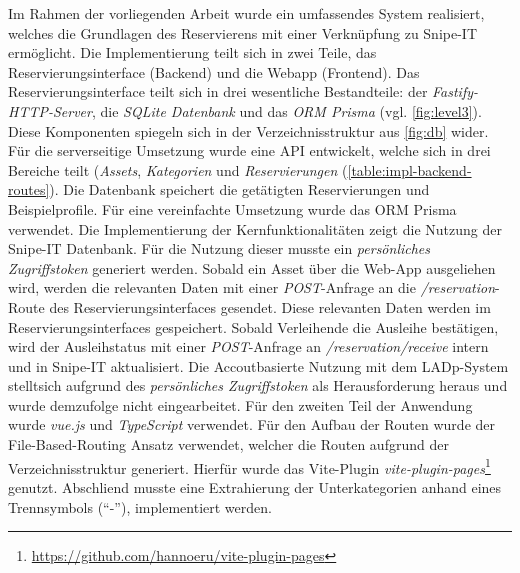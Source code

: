 Im Rahmen der vorliegenden Arbeit wurde ein umfassendes System realisiert, welches die Grundlagen
des Reservierens mit einer Verknüpfung zu Snipe-IT ermöglicht. Die Implementierung teilt sich in
zwei Teile, das Reservierungsinterface (Backend) und die Webapp (Frontend). Das
Reservierungsinterface teilt sich in drei wesentliche Bestandteile: der
\textit{Fastify-HTTP-Server}, die \textit{SQLite Datenbank} und das \textit{ORM Prisma} (vgl.
\ref{fig:level3}). Diese Komponenten spiegeln sich in der Verzeichnisstruktur aus \ref{fig:db}
wider. Für die serverseitige Umsetzung wurde eine API entwickelt, welche sich in drei Bereiche teilt
(\textit{Assets}, \textit{Kategorien} und \textit{Reservierungen} (\ref{table:impl-backend-routes}).
Die Datenbank speichert die getätigten Reservierungen und Beispielprofile. Für eine vereinfachte
Umsetzung wurde das ORM Prisma verwendet. Die Implementierung der Kernfunktionalitäten zeigt die
Nutzung der Snipe-IT Datenbank. Für die Nutzung dieser musste ein \textit{persönliches
Zugriffstoken} generiert werden. Sobald ein Asset über die Web-App ausgeliehen wird, werden die
relevanten Daten mit einer \textit{POST}-Anfrage an die \textit{/reservation}-Route des
Reservierungsinterfaces gesendet. Diese relevanten Daten werden im Reservierungsinterfaces
gespeichert. Sobald Verleihende die Ausleihe bestätigen, wird der Ausleihstatus mit einer
\textit{POST}-Anfrage an \textit{/reservation/receive} intern und in Snipe-IT aktualisiert. Die
Accoutbasierte Nutzung mit dem LADp-System stelltsich aufgrund des \textit{persönliches
Zugriffstoken} als Herausforderung heraus und wurde demzufolge nicht eingearbeitet. Für den zweiten
Teil der Anwendung wurde \textit{vue.js} und \textit{TypeScript} verwendet. Für den Aufbau der
Routen wurde der File-Based-Routing Ansatz verwendet, welcher die Routen aufgrund der
Verzeichnisstruktur generiert. Hierfür wurde das Vite-Plugin
\textit{vite-plugin-pages}\footnote{\url{https://github.com/hannoeru/vite-plugin-pages}} genutzt.
Abschliend musste eine Extrahierung der Unterkategorien anhand eines Trennsymbols (\enquote{-}),
implementiert werden. 